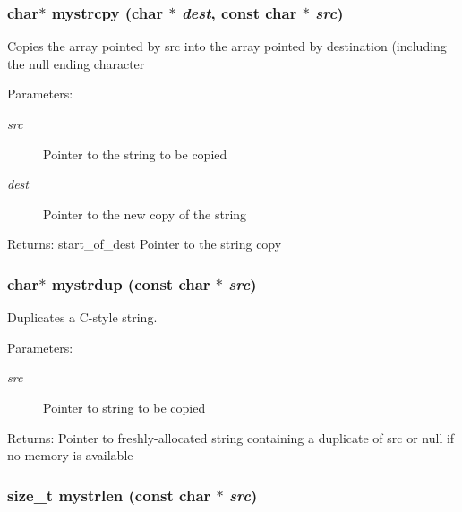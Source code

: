 \subsubsection{\setlength{\rightskip}{0pt plus 5cm}char$\ast$ mystrcpy (char $\ast$ {\em dest}, const char $\ast$ {\em src})}\label{mystring_8h_515b2c58f31e99a4564e463ffbf73e2f}


Copies the array pointed by src into the array pointed by destination (including the null ending character \begin{Desc}
\item[Parameters:]
\begin{description}
\item[{\em src}]Pointer to the string to be copied \item[{\em dest}]Pointer to the new copy of the string \end{description}
\end{Desc}
\begin{Desc}
\item[Returns:]start\_\-of\_\-dest Pointer to the string copy \end{Desc}
\subsubsection{\setlength{\rightskip}{0pt plus 5cm}char$\ast$ mystrdup (const char $\ast$ {\em src})}\label{mystring_8h_148a52c665d88f52fb4995338a319d3c}


Duplicates a C-style string. \begin{Desc}
\item[Parameters:]
\begin{description}
\item[{\em src}]Pointer to string to be copied \end{description}
\end{Desc}
\begin{Desc}
\item[Returns:]Pointer to freshly-allocated string containing a duplicate of src or null if no memory is available \end{Desc}
\subsubsection{\setlength{\rightskip}{0pt plus 5cm}size\_\-t mystrlen (const char $\ast$ {\em src})}\label{mystring_8h_eb723b75f0ec2e593259bd9e6a0837bb}


